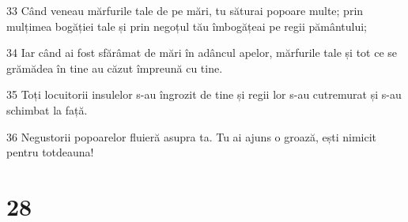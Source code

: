 \par 33 Când veneau mărfurile tale de pe mări, tu săturai popoare multe; prin mulțimea bogăției tale și prin negoțul tău îmbogățeai pe regii pământului;
\par 34 Iar când ai fost sfărâmat de mări în adâncul apelor, mărfurile tale și tot ce se grămădea în tine au căzut împreună cu tine.
\par 35 Toți locuitorii insulelor s-au îngrozit de tine și regii lor s-au cutremurat și s-au schimbat la față.
\par 36 Negustorii popoarelor fluieră asupra ta. Tu ai ajuns o groază, ești nimicit pentru totdeauna!

\chapter{28}

